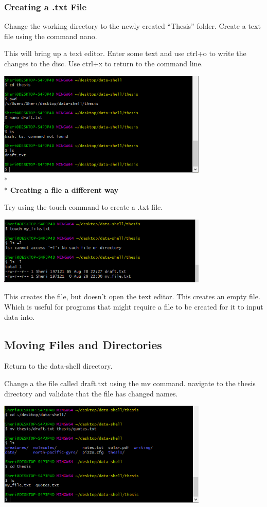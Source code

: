 \documentclass{article}
\begin{document}
\subsubsection{Creating a .txt File}

Change the working directory to the newly created ``Thesis'' folder. Create a text file using the command nano.

This will bring up a text editor. Enter some text and use ctrl+o to write the changes to the disc. Use ctrl+x to return to the command line.

\includegraphics[width=10cm]{Images/GitBash_014.PNG}
\\*
\\*
\textbf{Creating a file a different way}

Try using the touch command to create a .txt file.

\includegraphics[width=10cm]{Images/GitBash_015.PNG}

This creates the file, but doesn't open the text editor. This creates an empty file. Which is useful for programs that might require a file to be created for it to input data into.

\subsection{Moving Files and Directories}
Return to the data-shell directory.

Change a the file called draft.txt using the mv command.
navigate to the thesis directory and validate that the file has changed names.

\includegraphics[width=10cm]{Images/GitBash_016.PNG}
\end{document}
